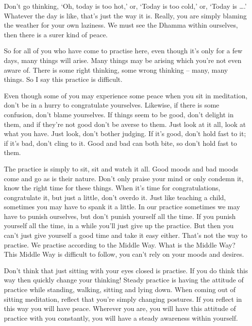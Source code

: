 Don't go thinking, `Oh, today is too hot,' or, `Today is too cold,' or, `Today is \ldots{}.' Whatever the day is like, that's just the way it is. Really, you are simply blaming the weather for your own laziness. We must see the Dhamma within ourselves, then there is a surer kind of peace. 

So for all of you who have come to practise here, even though it's only for a few days, many things will arise. Many things may be arising which you're not even aware of. There is some right thinking, some wrong thinking -- many, many things. So I say this practice is difficult. 

Even though some of you may experience some peace when you sit in meditation, don't be in a hurry to congratulate yourselves. Likewise, if there is some confusion, don't blame yourselves. If things seem to be good, don't delight in them, and if they're not good don't be averse to them. Just look at it all, look at what you have. Just look, don't bother judging. If it's good, don't hold fast to it; if it's bad, don't cling to it. Good and bad can both bite, so don't hold fast to them. 

The practice is simply to sit, sit and watch it all. Good moods and bad moods come and go as is their nature. Don't only praise your mind or only condemn it, know the right time for these things. When it's time for congratulations, congratulate it, but just a little, don't overdo it. Just like teaching a child, sometimes you may have to spank it a little. In our practice sometimes we may have to punish ourselves, but don't punish yourself all the time. If you punish yourself all the time, in a while you'll just give up the practice. But then you can't just give yourself a good time and take it easy either. That's not the way to practise. We practise according to the Middle Way. What is the Middle Way? This Middle Way is difficult to follow, you can't rely on your moods and desires. 

Don't think that just sitting with your eyes closed is practise. If you do think this way then quickly change your thinking! Steady practice is having the attitude of practice while standing, walking, sitting and lying down. When coming out of sitting meditation, reflect that you're simply changing postures. If you reflect in this way you will have peace. Wherever you are, you will have this attitude of practice with you constantly, you will have a steady awareness within yourself. 

